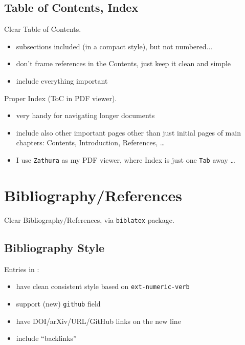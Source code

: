 \subsection{Table of Contents, Index}%
\label{sub:Table of Contents and Index}

Clear Table of Contents.
\begin{itemize}
    \item subsections included (in a compact style), but not numbered...
    \item don't frame references in the Contents, just keep it clean and simple
    \item include everything important
\end{itemize}

Proper Index (ToC in PDF viewer).
\begin{itemize}
    \item very handy for navigating longer documents
    \item include also other important pages other than just initial pages of main chapters: Contents, Introduction, References, \ldots
    \item I use \texttt{Zathura} as my PDF viewer, where Index is just one \texttt{Tab} away \ldots
\end{itemize}


\section{Bibliography/References}%
\label{sec:Bibliography/References}

Clear Bibliography/References, via \texttt{biblatex} package.

\subsection{Bibliography Style}%
\label{sub:Bibliography Style}

Entries in :
\begin{itemize}
    \item have clean consistent style based on \texttt{ext-numeric-verb}
    \item support (new) \texttt{github} field
    \item have DOI/arXiv/URL/GitHub links on the new line
    \item include \enquote{backlinks}
\end{itemize}

